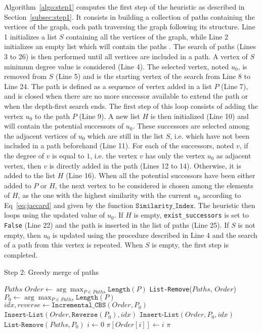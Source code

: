 \documentclass{scrartcl}
\theoremstyle{plain}
\begin{document}
Algorithm~\ref{algo:step1} computes the first step of the heuristic as described 
in Section~\ref{subsec:step1}. It consists in building a collection of paths 
containing the vertices of the graph, each  path traversing the graph following 
its structure. Line 1 initializes a list $S$ containing all the vertices of the 
graph, while Line 2 initializes an empty list which will contain the paths . The 
search of paths (Lines 3 to 26) is then performed until all vertices are 
included in a path. A vertex of $S$ minimum degree value is considered (Line 4). 
The selected vertex, noted $u_0$, is removed from $S$ (Line 5) and is the 
starting vertex of the search from Line 8 to Line 24. The path is defined as a 
sequence of vertex added in a list $P$ (Line 7), and is closed when there are no 
more successor available to extend the path or when the depth-first search ends. 
The first step of this loop consists of adding the vertex $u_0$ to the path $P$ 
(Line 9). A new list $H$ is then initialized (Line 10) and will contain the 
potential successors of $u_0$. These successors are selected among the adjacent 
vertices of $u_0$ which are still in the list $S$, i.e. which have not been 
included in a path beforehand (Line 11). For each of the successors, noted $v$, 
if the degree of $v$ is equal to $1$, i.e. the vertex $v$ has only the vertex 
$u_0$ as adjacent vertex, then $v$ is directly added in the path (Lines 12 to 
14). Otherwise, it is added to the list $H$ (Line 16). When all the potential 
successors have been either added to $P$ or $H$, the next vertex to be 
considered is chosen among the elements of $H$, as the one with the highest 
similarity with the current $u_0$ according to Eq~\ref{eq:jaccard} and given by 
the function $\texttt{Similarity\_Index}$. The heuristic then loops using the 
updated value of $u_0$. If $H$ is empty, \texttt{exist\_successors} is set to 
\texttt{False} (Line 22)  and the path is inserted in the list of paths (Line 
25). If $S$ is not empty, then $u_0$ is updated using the procedure described in 
Line 4 and the search of a path from this vertex is repeated. When $S$ is empty, 
the first step is completed.

\begin{algorithm}[!ht]
  \caption{Step 2: Greedy merge of paths}
  \label{algo:step2}
  \begin{algorithmic}[1]
	\REQUIRE $Paths$
    \STATE $Order \leftarrow \arg\max_{P\in Paths}\texttt{Length}(P)$
    \STATE \texttt{List-Remove}($Paths$, $Order$)
    \STATE $P_0 \leftarrow \arg\max_{P\in Paths} \texttt{Length}(P)$
    \STATE $idx, reverse \leftarrow \texttt{Incremental\_CBS}(Order, P_0)$
	\STATE $\texttt{Insert-List}(Order, \texttt{Reverse}(P_0), idx)$
	\ELSE
	\STATE $\texttt{Insert-List}(Order, P_0, idx)$
    \ENDIF
    \STATE $\texttt{List-Remove}(Paths, P_0)$
    \ENDWHILE
    \STATE
    \STATE $i \leftarrow 0$
    \STATE $\pi[Order[i]]\leftarrow i$
    \ENDFOR
    \RETURN $\pi$
  \end{algorithmic}
\end{algorithm}
\end{document}
